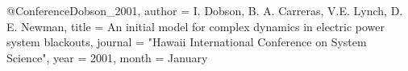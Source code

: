 

@Conference{Dobson_2001,
  author =       {I. Dobson, B. A. Carreras, V.E. Lynch, D. E. Newman},
  title =        {An initial model for complex dynamics in electric power system blackouts},
  journal =      "Hawaii International Conference on System Science",
  year =         {2001},
  month =     {January}
}